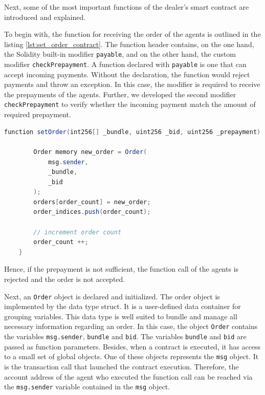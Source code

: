 Next, some of the most important functions of the dealer's smart contract are introduced and explained.

To begin with, the function for receiving the order of the agents is outlined in the listing \ref{lst:set_order_contract}.
The function header contains, on the one hand, the Solidity built-in modifier \verb|payable|, and on the other hand, the custom
modifier \verb|checkPrepayment|. A function declared with \verb|payable| is one that can accept incoming payments. 
Without the declaration, the function would reject payments and throw an exception. In this case, the modifier is required 
to receive the prepayments of the agents. 
Further, we developed the second modifier \verb|checkPrepayment| to verify whether the incoming payment match the amount
of required prepayment.

\begin{lstlisting}[float=htbp, label=lst:set_order_contract, caption=Receiving agents orders, language=Java]
    function setOrder(int256[] _bundle, uint256 _bid, uint256 _prepayment) public payable checkPrepayment(_prepayment) {

        Order memory new_order = Order(
            msg.sender,
            _bundle,
            _bid
        );
        orders[order_count] = new_order;
        order_indices.push(order_count);

        // increment order count
        order_count ++;
    }
\end{lstlisting}

Hence, if the prepayment is not sufficient, the function call of the agents is rejected and 
the order is not accepted.

Next, an \verb|Order| object is declared and initialized. The order object is implemented by the data type
struct. It is a user-defined data container for grouping variables.
This data type is well suited to bundle and manage all necessary information regarding an order.
In this case, the object \verb|Order| contains the variables \verb|msg.sender|, \verb|bundle| and \verb|bid|.
The variables \verb|bundle| and \verb|bid| are passed as function parameters.
Besides, when a contract is executed, it has access to a small set of global objects. 
One of these objects represents the \verb|msg| object. It is the transaction call that launched the contract execution.
Therefore, the account address of the agent who executed the function call can be reached via the \verb|msg.sender| variable
contained in the \verb|msg| object.

